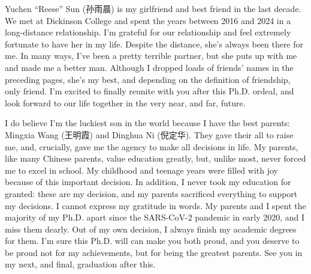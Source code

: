 Yuchen ``Reese'' Sun (孙雨晨) is my girlfriend and best friend in the last decade. We met at Dickinson College and spent the years between 2016 and 2024 in a long-distance relationship. I'm grateful for our relationship and feel extremely fortunate to have her in my life. Despite the distance, she's always been there for me. In many ways, I've been a pretty terrible partner, but she puts up with me and made me a better man. Although I dropped loads of friends' names in the preceding pages, she's my best, and depending on the definition of friendship, only friend. I'm excited to finally reunite with you after this Ph.D. ordeal, and look forward to our life together in the very near, and far, future.

I do believe I'm the luckiest son in the world because I have the best parents: Mingxia Wang (王明霞) and Dinghua Ni (倪定华). They gave their all to raise me, and, crucially, gave me the agency to make all decisions in life. My parents, like many Chinese parents, value education greatly, but, unlike most, never forced me to excel in school. My childhood and teenage years were filled with joy because of this important decision. In addition, I never took my education for granted: these are my decision, and my parents sacrificed everything to support my decisions. I cannot express my gratitude in words. My parents and I spent the majority of my Ph.D. apart since the SARS-CoV-2 pandemic in early 2020, and I miss them dearly. Out of my own decision, I always finish my academic degrees for them. I'm sure this Ph.D. will can make you both proud, and you deserve to be proud not for my achievements, but for being the greatest parents. See you in my next, and final, graduation after this.

